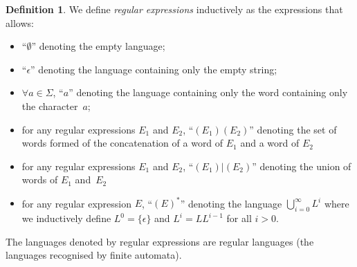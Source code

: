 \documentclass[12px]{article}
\theoremstyle{definition}
\newtheorem{definition}{Definition}
\begin{document}
        \begin{definition}
          We define \emph{regular expressions} inductively as the expressions
          that allows:
            \begin{itemize}
              \item ``$\emptyset$'' denoting the empty language;
              \item ``$\epsilon$'' denoting the language containing only the
                empty string;
              \item $\forall a \in \Sigma$, ``$a$'' denoting the language
                containing only the word containing only the
                character~$a$;
              \item for any regular expressions $E_1$ and $E_2$, ``$(E_1)
                (E_2)$'' denoting the set of words formed of the concatenation
                of a word of $E_1$ and a word of $E_2$
              \item for any regular expressions $E_1$ and $E_2$,
                ``$(E_1)|(E_2)$'' denoting the union of words of $E_1$
                and~$E_2$
              \item for any regular expression $E$, ``${(E)}^*$'' denoting the
                language $\bigcup\limits_{i = 0}^\infty L^i$ where we
                inductively define $L^0 = \{\epsilon\}$ and $L^i = L L^{i-1}$
                for all $i > 0$.
            \end{itemize}

          The languages denoted by regular expressions are regular languages
          (the languages recognised by finite automata).
        \end{definition}
\end{document}

